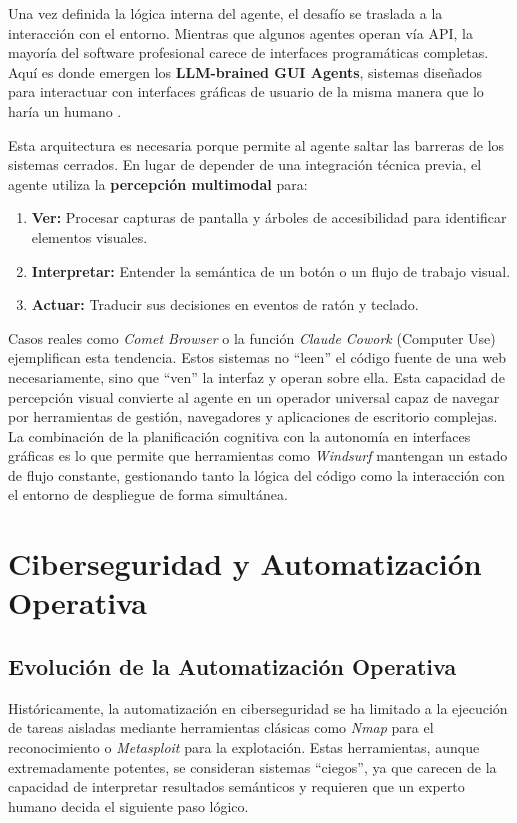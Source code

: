 Una vez definida la lógica interna del agente, el desafío se traslada a la interacción con el entorno. Mientras que algunos agentes operan vía API, la mayoría del software profesional carece de interfaces programáticas completas. Aquí es donde emergen los \textbf{LLM-brained GUI Agents}, sistemas diseñados para interactuar con interfaces gráficas de usuario de la misma manera que lo haría un humano \cite{zhang2024survey}.

Esta arquitectura es necesaria porque permite al agente saltar las barreras de los sistemas cerrados. En lugar de depender de una integración técnica previa, el agente utiliza la \textbf{percepción multimodal} para:
\begin{enumerate}
    \item \textbf{Ver:} Procesar capturas de pantalla y árboles de accesibilidad para identificar elementos visuales.
    \item \textbf{Interpretar:} Entender la semántica de un botón o un flujo de trabajo visual.
    \item \textbf{Actuar:} Traducir sus decisiones en eventos de ratón y teclado.
\end{enumerate}

Casos reales como \textit{Comet Browser} o la función \textit{Claude Cowork} (Computer Use) ejemplifican esta tendencia. \cite{templeton2024claude}
Estos sistemas no ``leen'' el código fuente de una web necesariamente, sino que ``ven'' la interfaz y operan sobre ella. Esta capacidad de percepción visual convierte al agente en un operador universal capaz de navegar por herramientas de gestión, navegadores y aplicaciones de escritorio complejas. La combinación de la planificación cognitiva con la autonomía en interfaces gráficas es lo que permite que herramientas como \textit{Windsurf} mantengan un estado de flujo constante, gestionando tanto la lógica del código como la interacción con el entorno de despliegue de forma simultánea.


\section{Ciberseguridad y Automatización Operativa}

\subsection{Evolución de la Automatización Operativa}

Históricamente, la automatización en ciberseguridad se ha limitado a la ejecución de tareas aisladas mediante herramientas clásicas como \textit{Nmap} para el reconocimiento o \textit{Metasploit} para la explotación.
Estas herramientas, aunque extremadamente potentes, se consideran sistemas ``ciegos'', ya que carecen de la capacidad de interpretar resultados semánticos y requieren que un experto humano decida el siguiente paso lógico.

